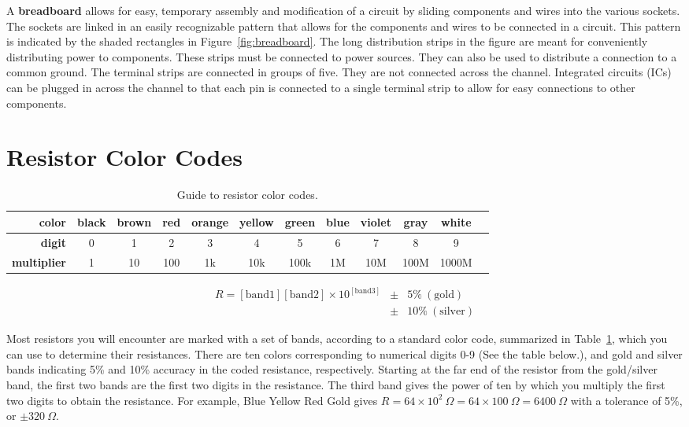 \documentclass[11pt]{article}
\begin{document}
A \textbf{breadboard} allows for easy, temporary assembly and
modification of a circuit by sliding components and wires into the
various sockets. The sockets are linked in an easily recognizable
pattern that allows for the components and wires to be connected in a
circuit. This pattern is indicated by the shaded rectangles in
Figure~\ref{fig:breadboard}.  The long distribution strips in the
figure are meant for conveniently distributing power to
components. These strips must be connected to power sources. They can
also be used to distribute a connection to a common ground.  The
terminal strips are connected in groups of five. They are not
connected across the channel. Integrated circuits (ICs) can be plugged
in across the channel to that each pin is connected to a single
terminal strip to allow for easy connections to other components.

\section{Resistor Color Codes}

\begin{table}
\begin{center}
\begin{tabular}{|r|c|c|c|c|c|c|c|c|c|c|c|}\hline
\bf color      & \color{white}\cellcolor{Black}black & \color{white}\cellcolor{Brown}brown & \cellcolor{Red}red & \cellcolor{Orange}orange & \cellcolor{Yellow}yellow & \cellcolor{Green}green & \cellcolor{Blue}blue &
\cellcolor{Purple}violet & \cellcolor{Gray}gray & white \\\hline
\bf digit      & 0     & 1     & 2   & 3      & 4      & 5     & 6    &
7      & 8    & 9     \\\hline
\bf multiplier & 1     & 10    & 100 & 1k     & 10k    & 100k  & 1M   &
10M    & 100M & 1000M \\\hline
\end{tabular}
\begin{eqnarray*}
  R = [\mathrm{band 1}][\mathrm{band 2}] 
       \times 10^{[\mathrm{band 3}]} & \pm & 5\%~(\mathrm{gold})\\ 
                                 & \pm & 10\%~(\mathrm{silver})\nonumber
\end{eqnarray*}
\caption{\label{tab:rcolorcodes} Guide to resistor color codes.}
\end{center}
\end{table}

Most resistors you will encounter are marked with a set of bands,
according to a standard color code, summarized in
Table~\ref{tab:rcolorcodes}, which you can use to determine their
resistances. There are ten colors corresponding to numerical digits
0-9 (See the table below.), and gold and silver bands indicating 5\%
and 10\% accuracy in the coded resistance, respectively.  Starting at
the far end of the resistor from the gold/silver band, the first two
bands are the first two digits in the resistance.  The third band
gives the power of ten by which you multiply the first two digits to
obtain the resistance. For example, Blue Yellow Red Gold gives $R = 64
\times 10^{2}~\Omega = 64 \times 100~\Omega = 6400~\Omega$ with a
tolerance of 5\%, or $\pm 320~\Omega$.
\end{document}
